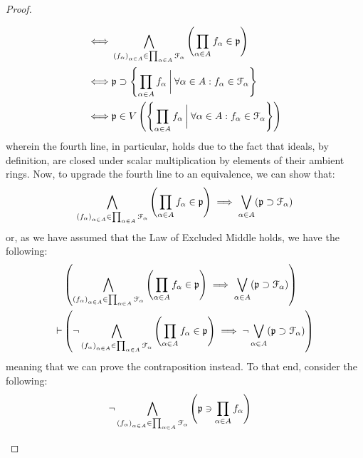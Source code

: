 \begin{proof}
\begin{enumerate}
$$\begin{aligned}
                                        \iff & \bigwedge_{\left(f_{\alpha}\right)_{\alpha \in A} \in \prod_{\alpha \in A} \calF_{\alpha}} \left(\prod_{\alpha \in A} f_{\alpha} \in \p\right)
                                        \\
                                        \iff & \p \supset \left\{\prod_{\alpha \in A} f_{\alpha} \: \bigg| \: \forall \alpha \in A: f_{\alpha} \in \calF_{\alpha} \right\}
                                        \\
                                        \iff & \p \in V\left(\left\{\prod_{\alpha \in A} f_{\alpha} \: \bigg| \: \forall \alpha \in A: f_{\alpha} \in \calF_{\alpha} \right\}\right)
                                    \end{aligned}
                                $$
                            wherein the fourth line, in particular, holds due to the fact that ideals, by definition, are closed under scalar multiplication by elements of their ambient rings. Now, to upgrade the fourth line to an equivalence, we can show that:
                                $$\bigwedge_{\left(f_{\alpha}\right)_{\alpha \in A} \in \prod_{\alpha \in A} \calF_{\alpha}} \left(\prod_{\alpha \in A} f_{\alpha} \in \p\right) \implies \bigvee_{\alpha \in A} (\p \supset \calF_{\alpha})$$
                            or, as we have assumed that the Law of Excluded Middle holds, we have the following:
                                $$
                                    \begin{aligned}
                                        & \left(\bigwedge_{\left(f_{\alpha}\right)_{\alpha \in A} \in \prod_{\alpha \in A} \calF_{\alpha}} \left(\prod_{\alpha \in A} f_{\alpha} \in \p\right) \implies \bigvee_{\alpha \in A} (\p \supset \calF_{\alpha})\right)
                                        \\
                                        \vdash & \left(\neg \bigwedge_{\left(f_{\alpha}\right)_{\alpha \in A} \in \prod_{\alpha \in A} \calF_{\alpha}} \left(\prod_{\alpha \in A} f_{\alpha} \in \p\right) \implies  \neg \bigvee_{\alpha \in A} (\p \supset \calF_{\alpha})\right)
                                    \end{aligned}
                                $$
                            meaning that we can prove the contraposition instead. To that end, consider the following:
                                $$
                                    \begin{aligned}
                                        & \neg \bigwedge_{\left(f_{\alpha}\right)_{\alpha \in A} \in \prod_{\alpha \in A} \calF_{\alpha}} \left(\p \ni \prod_{\alpha \in A} f_{\alpha}\right)

\end{aligned}$$
\end{enumerate}
\end{proof}
